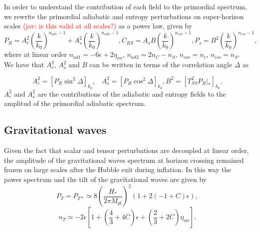 \documentclass[amssymb,twocolumn,prd,nofootinbib,showpacs]{revtex4-1}
\newcommand{\jav}[1]{\textcolor{red}{(jav: #1)}}
\begin{document}
In order to understand the contribution of each field to the primordial spectrum, we rewrite the primordial adiabatic 
and entropy perturbations on super-horizon scales \jav{is this valid at all scales?} as a power law, given by
%
\begin{subequations}\label{PswAs}
\begin{equation}\label{PrAs}
P_R=A_r^2\left(\frac{k}{k_0}\right)^{n_{ad1}-1}+A_s^2\left(\frac{k}{k_0}\right)^{n_{ad2}-1},
\end{equation}
\begin{equation}\label{PrCrs}
C_{RS}=A_sB\left(\frac{k}{k_0}\right)^{n_{cor}-1},
\end{equation}
\begin{equation}\label{PsAs}
P_s=B^2\left(\frac{k}{k_0}\right)^{n_{iso}-1},
\end{equation}
\end{subequations}
%
where at linear order $n_{ad1}=-6\epsilon+2\eta_{\sigma\sigma}$, $n_{ad2}=2n_C-n_S$, 
$n_{cor}=n_c$, $n_{iso}=n_S$. We have that $A_r^2$, $A_s^2$ and $B$ can be written in 
terms of the correlation angle $\Delta$ as

\begin{subequations}
\label{RelAs}
\begin{equation}
A_r^2=[P_R\sin^2\Delta]_{k_0}, \ \ \ \ A_s^2=[P_R\cos^2\Delta]_{k_0},
\end{equation}
\begin{equation}
B^2=[T_{SS}^2 P_R|_*]_{k_0}.
\end{equation}
\end{subequations}
%
$A_r^2$ and $A_s^2$ are the contributions of the adiabatic and entropy fields to the amplitud 
of the primordial adiabatic spectrum. 

\subsection{Gravitational waves}

Given the fact that scalar and tensor perturbations are decoupled at linear order, the amplitude of 
the gravitational waves spectrum at horizon crossing 
remained frozen on large scales after the Hubble exit during inflation. 
In this way the power spectrum and the tilt of the gravitational waves are given by
%
\begin{equation}
P_T=P_{T*}\simeq 8 \left(\frac{H_*}{2\pi M_{pl}}\right)^2(1+2(-1+C)\epsilon),
\end{equation}
\begin{equation}\label{tiltsnt}
n_T\simeq -2\epsilon\left[1+\left(\frac{4}{3}+4C\right)\epsilon+\left(\frac{2}{3}+2C\right)\eta_{\sigma\sigma}\right].
\end{equation}
\end{document}
